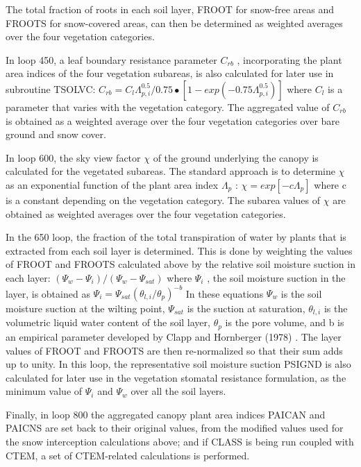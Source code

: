 The total fraction of roots in each soil layer, F\+R\+O\+O\+T for snow-\/free areas and F\+R\+O\+O\+T\+S for snow-\/covered areas, can then be determined as weighted averages over the four vegetation categories.

In loop 450, a leaf boundary resistance parameter $C_{rb}$ , incorporating the plant area indices of the four vegetation subareas, is also calculated for later use in subroutine T\+S\+O\+L\+V\+C\+: $C_{rb} = C_l \Lambda_{p,i}^{0.5} /0.75 \bullet [1 - exp(-0.75 \Lambda_{p,i}^{0.5} )]$ where $C_l$ is a parameter that varies with the vegetation category. The aggregated value of $C_{rb}$ is obtained as a weighted average over the four vegetation categories over bare ground and snow cover.

In loop 600, the sky view factor $\chi$ of the ground underlying the canopy is calculated for the vegetated subareas. The standard approach is to determine $\chi$ as an exponential function of the plant area index $\Lambda_p$ \+: $\chi = exp[-c \Lambda_p ]$ where c is a constant depending on the vegetation category. The subarea values of $\chi$ are obtained as weighted averages over the four vegetation categories.

In the 650 loop, the fraction of the total transpiration of water by plants that is extracted from each soil layer is determined. This is done by weighting the values of F\+R\+O\+O\+T and F\+R\+O\+O\+T\+S calculated above by the relative soil moisture suction in each layer\+: $( \Psi_w - \Psi_i )/( \Psi_w - \Psi_{sat} )$ where $\Psi_i$ , the soil moisture suction in the layer, is obtained as $\Psi_i = \Psi_{sat} ( \theta_{l,i} / \theta_p )^{-b}$ In these equations $\Psi_w$ is the soil moisture suction at the wilting point, $\Psi_{sat}$ is the suction at saturation, $\theta_{l,i}$ is the volumetric liquid water content of the soil layer, $\theta_p$ is the pore volume, and b is an empirical parameter developed by Clapp and Hornberger (1978) \cite{Clapp1978-898}. The layer values of F\+R\+O\+O\+T and F\+R\+O\+O\+T\+S are then re-\/normalized so that their sum adds up to unity. In this loop, the representative soil moisture suction P\+S\+I\+G\+N\+D is also calculated for later use in the vegetation stomatal resistance formulation, as the minimum value of $\Psi_i$ and $\Psi_w$ over all the soil layers.

Finally, in loop 800 the aggregated canopy plant area indices P\+A\+I\+C\+A\+N and P\+A\+I\+C\+N\+S are set back to their original values, from the modified values used for the snow interception calculations above; and if C\+L\+A\+S\+S is being run coupled with C\+T\+E\+M, a set of C\+T\+E\+M-\/related calculations is performed.

